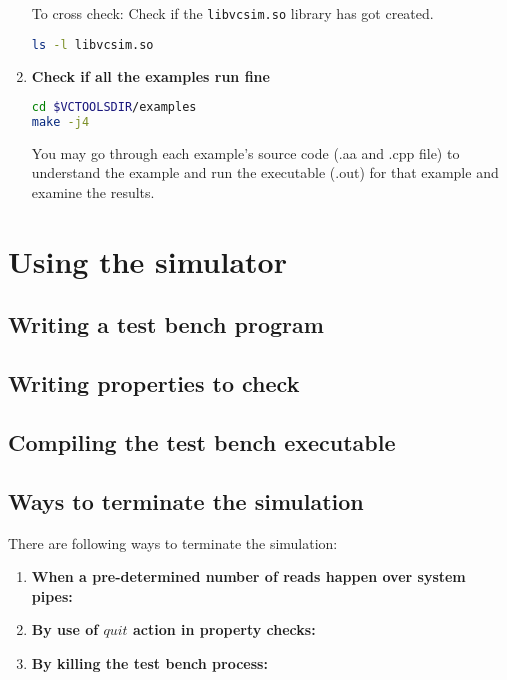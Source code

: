 \documentclass[12pt,a4paper]{article}
\begin{document}
\begin{enumerate}
To cross check: Check if the \texttt{libvcsim.so} library has got created.
\begin{lstlisting}[language=bash,style=snippet]
ls -l libvcsim.so
\end{lstlisting}

\item \textbf{Check if all the examples run fine}


\begin{lstlisting}[language=bash,style=snippet]
cd $VCTOOLSDIR/examples
make -j4
\end{lstlisting}

You may go through each example's source code (.aa and .cpp file) to understand the example and run the executable (.out) for that example and examine the results.

\end{enumerate}

\clearpage
\section{Using the simulator} \label{Sec:Usage}

\subsection{Writing a test bench program}

\subsection{Writing properties to check}

\subsection{Compiling the test bench executable}

\subsection{Ways to terminate the simulation}

There are following ways to terminate the simulation:

\begin{enumerate}
\item \textbf{When a pre-determined number of reads happen over system pipes:}
\item \textbf{By use of $quit$ action in property checks:}
\item \textbf{By killing the test bench process:}
\end{enumerate}
\end{document}
